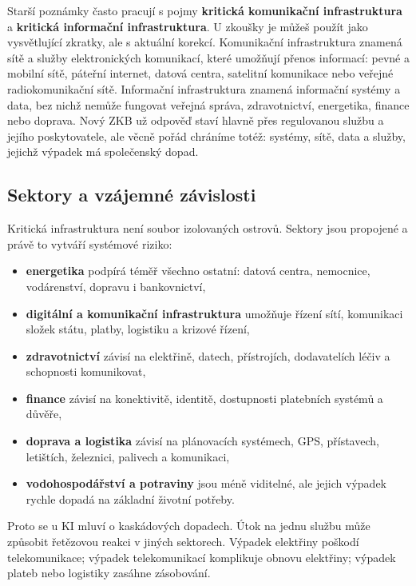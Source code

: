 
Starší poznámky často pracují s pojmy \textbf{kritická komunikační infrastruktura} a \textbf{kritická informační infrastruktura}. U zkoušky je můžeš použít jako vysvětlující zkratky, ale s aktuální korekcí. Komunikační infrastruktura znamená sítě a služby elektronických komunikací, které umožňují přenos informací: pevné a mobilní sítě, páteřní internet, datová centra, satelitní komunikace nebo veřejné radiokomunikační sítě. Informační infrastruktura znamená informační systémy a data, bez nichž nemůže fungovat veřejná správa, zdravotnictví, energetika, finance nebo doprava. Nový ZKB už odpověď staví hlavně přes regulovanou službu a jejího poskytovatele, ale věcně pořád chráníme totéž: systémy, sítě, data a služby, jejichž výpadek má společenský dopad.

\subsection*{Sektory a vzájemné závislosti}
Kritická infrastruktura není soubor izolovaných ostrovů. Sektory jsou propojené a právě to vytváří systémové riziko:
\begin{itemize}
  \item \textbf{energetika} podpírá téměř všechno ostatní: datová centra, nemocnice, vodárenství, dopravu i bankovnictví,
  \item \textbf{digitální a komunikační infrastruktura} umožňuje řízení sítí, komunikaci složek státu, platby, logistiku a krizové řízení,
  \item \textbf{zdravotnictví} závisí na elektřině, datech, přístrojích, dodavatelích léčiv a schopnosti komunikovat,
  \item \textbf{finance} závisí na konektivitě, identitě, dostupnosti platebních systémů a důvěře,
  \item \textbf{doprava a logistika} závisí na plánovacích systémech, GPS, přístavech, letištích, železnici, palivech a komunikaci,
  \item \textbf{vodohospodářství a potraviny} jsou méně viditelné, ale jejich výpadek rychle dopadá na základní životní potřeby.
\end{itemize}
Proto se u KI mluví o kaskádových dopadech. Útok na jednu službu může způsobit řetězovou reakci v jiných sektorech. Výpadek elektřiny poškodí telekomunikace; výpadek telekomunikací komplikuje obnovu elektřiny; výpadek plateb nebo logistiky zasáhne zásobování.

